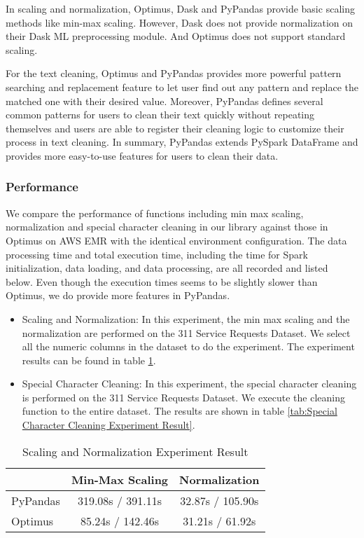 \documentclass[sigconf]{acmart}
\begin{document}
In scaling and normalization, Optimus, Dask and PyPandas provide basic scaling methods like min-max scaling. However, Dask does not provide normalization on their Dask ML preprocessing module. And Optimus does not support standard scaling.

For the text cleaning, Optimus and PyPandas provides more powerful pattern searching and replacement feature to let user find out any pattern and replace the matched one with their desired value. Moreover, PyPandas defines several common patterns for users to clean their text quickly without repeating themselves and users are able to register their cleaning logic to customize their process in text cleaning. In summary, PyPandas extends PySpark DataFrame and provides more easy-to-use features for users to clean their data.

\subsubsection{Performance} We compare the performance of functions including min max scaling, normalization and special character cleaning in our library against those in Optimus on AWS EMR with the identical environment configuration. The data processing time and total execution time, including the time for Spark initialization, data loading, and data processing, are all recorded and listed below. Even though the execution times seems to be slightly slower than Optimus, we do provide more features in PyPandas.

\begin{itemize}
	\item{Scaling and Normalization}: In this experiment, the min max scaling and the normalization are performed on the 311 Service Requests Dataset. We select all the numeric columns in the dataset to do the experiment. The experiment results can be found in table \ref{tab:Scaling and Normalization Experiment Result}.
	\item{Special Character Cleaning}: In this experiment, the special character cleaning is performed on the 311 Service Requests Dataset. We execute the cleaning function to the entire dataset. The results are shown in table \ref{tab:Special Character Cleaning Experiment Result}.
\end{itemize}

\begin{table}
\caption{Scaling and Normalization Experiment Result}   
\label{tab:Scaling and Normalization Experiment Result}
\begin{tabular}{lcc}   
 	         &  Min-Max Scaling  &  Normalization \\
\hline
PyPandas   &  319.08s / 391.11s  & 32.87s / 105.90s  \\ 
Optimus     &   85.24s / 142.46s   & 31.21s / 61.92s   \\
\end{tabular}
\end{table}
\end{document}
